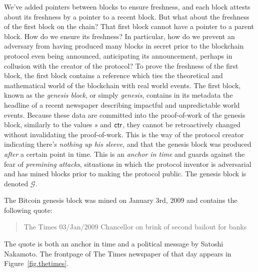 We've added pointers between blocks to ensure freshness, and each block attests about
its freshness by a pointer to a recent block. But what about the freshness of the first
block on the chain? That first block cannot have a pointer to a parent block. How do we
ensure its freshness? In particular, how do we prevent an adversary from having produced
many blocks in secret prior to the blockchain protocol even being announced, anticipating
its announcement, perhaps in collusion with the creator of the protocol? To prove the
freshness of the first block, the first block contains a reference which ties the theoretical
and mathematical world of the blockchain with real world events. The first block, known as
the \emph{genesis block}, or simply \emph{genesis}, contains in its metadata
the headline of a recent newspaper describing impactful and unpredictable world events.
Because these data are committed into the proof-of-work of the genesis block, similarly
to the values $s$ and $\mathsf{ctr}$, they cannot be retroactively changed without invalidating
the proof-of-work. This is the way of the protocol creator indicating there's
\emph{nothing up his sleeve}, and that the genesis block was produced \emph{after}
a certain point in time. This is an \emph{anchor in time} and guards against the fear
of \emph{premining attacks}, situations in which the protocol inventor
is adversarial and has mined blocks prior to making the protocol public. The genesis
block is denoted $\mathcal{G}$.

The Bitcoin genesis block was mined on January 3rd, 2009 and contains the following quote:

\begin{quote}
  The Times 03/Jan/2009 Chancellor on brink of second bailout for banks
\end{quote}

The quote is both an anchor in time and a political message by Satoshi Nakamoto. The
frontpage of The Times newspaper of that day appears in Figure~\ref{fig.thetimes}.

